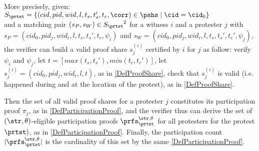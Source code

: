More precisely, given: \\
\(S_{\prtst} = \{ (cid, pid, wid, l, t_s, t_s', t_c, \corr) \in \pshs \mid \cid = \cid_0 \} \) \\
and a matching pair \((s_P, s_W) \in {S_{\prtst}}^2\) for a witness \(i\) and a protester \(j\)
with \(s_P = (cid_0, pid_j, wid_i, l, t_s, t_s', t_c, \psi_i)\)
and  \(s_W = (cid_0, pid_j, wid_i, l, t_s, t_s', t_c', \psi_j)\),
the verifier can build a valid proof share \(s_j^{(i)}\) certified by  \(i\) for \(j\) as follow:
verify \(\psi_i\) and \(\psi_j\),
let \(t = [max(t_s, t_s'), min(t_c, t_c')]\),
let \(s_j^{(i)} = (cid_0, pid_j, wid_i, l, t)\), as in \cref{DefProofShare},
check that \(s_j^{(i)}\) is valid (i.e. happened during and at the location of the protest), as in \cref{DefProofShare}.

Then the set of all valid proof shares for a protester \(j\) constitutes its participation proof \(\pi_{j}\), as in \cref{DefParticipationProof},
and the verifier thus can derive the set of \((\str,\theta)\)-eligible participation proofs \(\prfs_{\prtst}^{\str,\theta}\) for all protesters for the protest \(\prtst)\), as in \cref{DefParticipationProof}.
Finally, the  participation count \(|\prfs_{\prtst}^{\str,\theta}|\) is the cardinality of this set by the same \cref{DefParticipationProof}.







